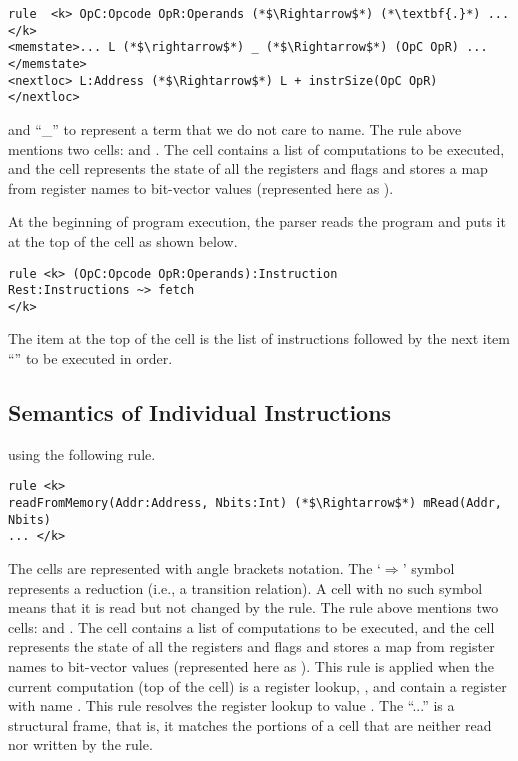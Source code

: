 



\begin{lstlisting}[style=KRULE]
rule  <k> OpC:Opcode OpR:Operands (*$\Rightarrow$*) (*\textbf{.}*) ...</k>
<memstate>... L (*$\rightarrow$*) _ (*$\Rightarrow$*) (OpC OpR) ...</memstate>
<nextloc> L:Address (*$\Rightarrow$*) L + instrSize(OpC OpR) </nextloc>
\end{lstlisting}
 and  ``\_'' to represent  a term that we do not care to name.
  The rule above
mentions two cells:  and . The  cell contains a list of
computations to be executed, and the  cell represents the
state of all the registers and flags and stores a map from register names to
bit-vector values (represented here as ).

At the beginning of program execution, the \K parser  reads the program and puts it at the top of the  cell as shown below. 
\begin{lstlisting}[style=KRULE]
rule <k> (OpC:Opcode OpR:Operands):Instruction
Rest:Instructions ~> fetch 
</k>
\end{lstlisting}
The item at the top of the cell is the list of instructions followed by the next item ``'' to be executed in order.

\subsection{Semantics of Individual Instructions}



using the following rule.  
\begin{lstlisting}[style=KRULE]
rule <k>
readFromMemory(Addr:Address, Nbits:Int) (*$\Rightarrow$*) mRead(Addr, Nbits)
... </k>
\end{lstlisting}
\noindent
The cells are represented with angle brackets notation. The `$\Rightarrow$' symbol
represents a reduction (i.e., a transition relation). A cell with no such symbol means that it is read but not changed by the rule.  The rule above
mentions two cells:  and . The  cell contains a list of
computations to be executed, and the  cell represents the
state of all the registers and flags and stores a map from register names to
bit-vector values (represented here as ). This rule
is applied when the current computation (top of the  cell) is a register
lookup, , and  contain a register
with name . This rule resolves the register lookup  to  value
. The ``...'' is a structural frame, that is, it matches the
portions of a cell that are neither read nor written by the rule.


